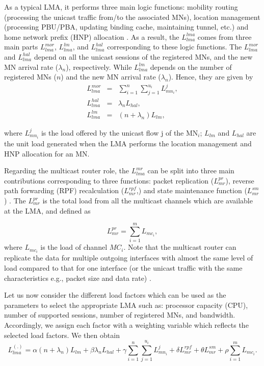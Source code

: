 As a typical LMA, it performs three main logic functions: mobility routing (processing the unicast traffic from/to the associated MNs), location management (processing PBU/PBA, updating binding cache, maintaining tunnel, etc.) and home network prefix (HNP) allocation \cite{PMIPv6}.
As a result, the $L_{lma}^{lma}$ comes from three main parts $L_{lma}^{mor}$, $L_{lma}^{lm}$, and $L_{lma}^{hal}$ corresponding to these logic functions. The $L_{lma}^{mor}$ and $L_{lma}^{hal}$ depend on all the unicast sessions of the registered MNs, and the new MN arrival rate ($\lambda_{n}$), respectively.  While $L_{lma}^{lm}$ depends on the number of registered MNs ($n$) and the new MN arrival rate ($\lambda_{n}$). Hence, they are given by
\begin{eqnarray}
    L_{lma}^{mor}&{} ={}& \sum_{i=1}^{n} \sum_{j=1}^{u_{i}} L_{mn_{i}}^{j},\\
    L_{lma}^{hal}&{} ={}& \lambda_{n} L_{hal},\\
     L_{lma}^{lm}&{} ={}& (n+ \lambda_{n}) L_{lm},
\end{eqnarray}

where $L_{mn_{i}}^{j}$ is the load offered by the unicast flow j of the MN$_{i}$; $L_{lm}$ and $L_{hal}$ are the unit load generated when the LMA performs the location management and HNP allocation for an MN. 

Regarding the multicast router role, the $L_{lma}^{mr}$ can be split into three main contributions corresponding to three functions: packet replication ($L_{mr}^{pr}$), reverse path forwarding (RPF) recalculation ($L_{mr}^{rpf}$,) and state maintenance function ($L_{mr}^{sm}$) \cite{developing_ip_multicast}. The $L_{mr}^{pr}$ is the total load from all the multicast channels which are available at the LMA, and defined as 
 
\begin{equation}
L_{mr}^{pr} = \sum_{i=1}^{m} L_{mc_{i}},
\end{equation}
where $L_{mc_{i}}$ is the load of channel $MC_{i}$.
Note that the multicast router can replicate the data for multiple outgoing interfaces with almost the same level of load compared to that for one interface (or the unicast traffic with the same characteristics e.g., packet size and data rate) \cite{developing_ip_multicast}.  

Let us now consider the different load factors which can be used as the parameters to select the appropriate LMA such as: processor capacity (CPU), number of supported sessions, number of registered MNs, and bandwidth. Accordingly, we assign each factor with a weighting variable which reflects the selected load factors. We then obtain\\
\begin{equation}
L_{lma}^{(.)} = \alpha \left( n + \lambda_{n} \right) L_{lm} + \beta  \lambda_{n} L_{hal} + \gamma \sum_{i=1}^{n} \sum_{j=1}^{u_{i}} L_{mn_{i}}^{j}  + \delta L_{mr}^{rpf} + \theta  L_{mr}^{sm} + \rho  \sum_{i=1}^{m} L_{mc_{i}}. 
\label{lma_load}
\end{equation}

